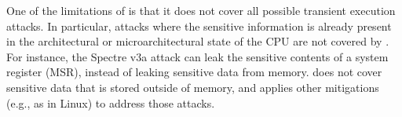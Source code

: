 One of the limitations of \contract{} is that it does not cover all
possible transient execution attacks.  In particular, attacks where
the sensitive information is already present in the architectural or
microarchitectural state of the CPU are not covered by \contract{}.
For instance, the Spectre v3a attack can leak the sensitive contents of
a system register (MSR), instead of leaking sensitive data from memory.
\contract{} does not cover sensitive data that is stored outside of
memory, and \sys applies other mitigations (e.g., as in Linux) to address
those attacks.

